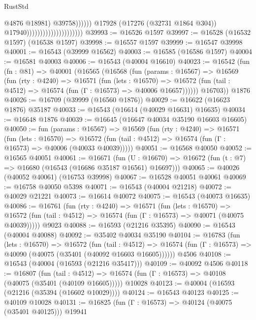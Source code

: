 \begin{lexlean}{RustStd}
\begin{coremodule}
                                                            @4876
                                                            @18981)
                                                          @39758))))))
                                              @17928
                                              (@17276 (@32731 @1864 @304))
                                              @17940)))))))))))))))))))))
@39993 := @16526 @1597
@39997 := @16528 (@16532 @1597) (@16538 @1597)
@39998 := @16557 @1597
@39999 := @16547 @39998
@40001 := @16543 (@39999 @16562)
@40003 := @16585 (@16586 @1597)
@40004 := @16581 @40003
@40006 := @16543 (@40004 @16610)
@40023 := @16542
    (fun (fn : @81) =>
    @40001
      (@16565
        (@16568
          (fun (params : @16567) =>
          @16569
            (fun (rty : @4240) =>
            @16571
              (fun (lets : @16570) =>
              @16572 (fun (tail : @4512) => @16574 (fun (Γ : @16573) => @40006 @16657))))))
        @16703))
    @1876
@40026 := @16709 (@39999 (@16560 @1876))
@40029 := @16622 (@16623 @1876) @35187
@40033 := @16543 (@16614 (@40029 @16631) @16635)
@40034 := @16648 @1876
@40039 := @16645 (@16647 @40034 @35190 @16603 @16605)
@40050 := fun (params : @16567) =>
  @16569
    (fun (rty : @4240) =>
    @16571
      (fun (lets : @16570) =>
      @16572 (fun (tail : @4512) => @16574 (fun (Γ : @16573) => @40006 (@40033 @40039)))))
@40051 := @16568 @40050
@40052 := @16565 @40051
@40061 := @16671
    (fun (U : @16670) => @16672 (fun (t : @7) => @16680 (@16543 (@16686 @35187 @16561) @16697)))
@40065 := @40026 (@40052 @40061) (@16753 @39998)
@40067 := @16528 @40051 @40061
@40069 := @16758 @40050 @5398
@40071 := @16543 (@40004 @21218)
@40072 := @40029 @21221
@40073 := @16614 @40072
@40075 := @16543 (@40073 @16635)
@40086 := @16761
    (fun (rty : @4240) =>
    @16571
      (fun (lets : @16570) =>
      @16572 (fun (tail : @4512) => @16574 (fun (Γ : @16573) => @40071 (@40075 @40039)))))
    @9023
@40088 := @16593 (@21216 @35395)
@40090 := @16543 (@40004 @40088)
@40092 := @35402 @40034 @35190
@40104 := @16783
    (fun (lets : @16570) =>
    @16572
      (fun (tail : @4512) =>
      @16574 (fun (Γ : @16573) => @40090 (@40075 (@35401 (@40092 @16603 @16605))))))
    @4506
@40108 := @16543 (@40004 (@16593 (@21216 @35417)))
@40109 := @40092 @4506
@40118 := @16807
    (fun (tail : @4512) => @16574 (fun (Γ : @16573) => @40108 (@40075 (@35401 (@40109 @16605)))))
    @10028
@40123 := @40004 (@16593 (@21216 (@35394 (@16602 @10029))))
@40124 := @16543 @40123
@40125 := @40109 @10028
@40131 := @16825 (fun (Γ : @16573) => @40124 (@40075 (@35401 @40125))) @19941

\end{coremodule}
\end{lexlean}
